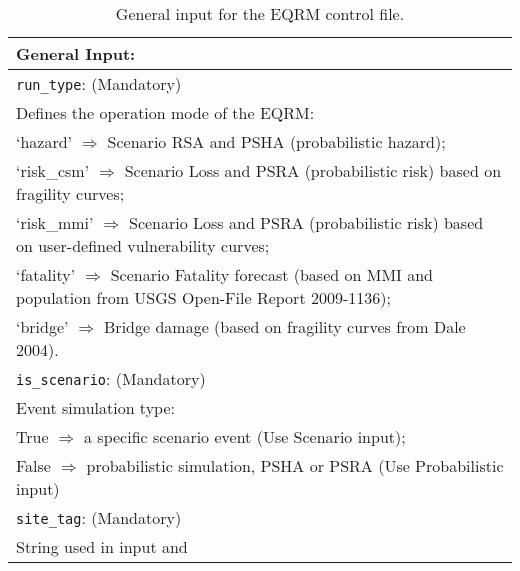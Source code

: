 \begin{table}
\caption{General input for the EQRM control file.}
\label{tab:general_input-cf} \centering
\vspace{2em}
\begin{tabular}{|p{\textwidth}|}
\hline
\vspace{0.3em} \noindent \Large \textbf{General Input:} \normalsize \\
\hline \vspace{0.1em} \texttt{run\_type}: (Mandatory) \\
Defines the operation mode of the EQRM: \\
  \hspace{0.5em} `hazard' $\Rightarrow$ Scenario RSA and PSHA (probabilistic 
  hazard); \\
  \hspace{0.5em} `risk\_csm' $\Rightarrow$ Scenario Loss and PSRA (probabilistic 
  risk) based on fragility curves; \\
  \hspace{0.5em} `risk\_mmi' $\Rightarrow$ Scenario Loss and PSRA (probabilistic 
  risk) based on user-defined vulnerability curves; \\
  \hspace{0.5em} `fatality' $\Rightarrow$ Scenario Fatality forecast (based on 
  MMI and population from USGS Open-File Report 2009-1136); \\
  \hspace{0.5em} `bridge' $\Rightarrow$ Bridge damage (based on fragility curves
  from Dale 2004). \\
 \hline
\vspace{0.1em} \texttt{is\_scenario}: (Mandatory) \\
Event simulation type: \\
  \hspace{0.5em} True $\Rightarrow$ a specific scenario event (Use Scenario input); \\
  \hspace{0.5em} False $\Rightarrow$ probabilistic simulation, PSHA or PSRA (Use Probabilistic input) \\
\hline \vspace{0.1em} \texttt{site\_tag}: (Mandatory)\\
String used in input and

\end{tabular}
\end{table}
